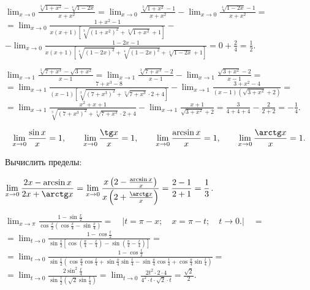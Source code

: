 \documentclass[a5paper,10pt]{article}
\begin{document}
\medskip
{} $\displaystyle\lim_{x\to 0}
\frac{\sqrt[3]{1+x^2}-\sqrt[4]{1-2x}}{x+x^2}=
\lim_{x\to 0}\frac{\sqrt[3]{1+x^2}-1}{x+x^2}-
\lim_{x\to 0}\frac{\sqrt[4]{1-2x}-1}{x+x^2}=$\\
$\displaystyle =\lim_{x\to 0}\frac{1+x^2-1}
{x(x+1)[\sqrt[3]{(1+x^2)^2}+\sqrt[3]{1+x^2}+1]}-$\\
$\displaystyle-\lim_{x\to 0}\frac{1-2x-1}
{x(x+1)[\sqrt[4]{(1-2x)^3}+\sqrt[4]{(1-2x)^2}+\sqrt[4]{1-2x}+1]}=
0+\frac24=\frac12$.

\medskip
{} $\displaystyle\lim_{x\to 1}
\frac{\sqrt[3]{7+x^3}-\sqrt{3+x^2}}{x-1}=
\lim_{x\to 1}\frac{\sqrt[3]{7+x^3}-2}{x-1}-
\lim_{x\to 1}\frac{\sqrt{3+x^2}-2}{x-1}=$\\
$\displaystyle=\lim_{x\to 1}\frac{7+x^3-8}
{(x-1)[\sqrt[3]{(7+x^3)^2}+\sqrt[3]{7+x^3}\cdot2+4]}-
\lim_{x\to 1}\frac{3+x^2-4}{(x-1)(\sqrt{3+x^2}+2)}=$\\
$\displaystyle=\lim_{x\to 1}\frac{x^2+x+1}
{\sqrt[3]{(7+x^3)^2}+\sqrt[3]{7+x^3}\cdot2+4}-
\lim_{x\to 1}\frac{x+1}{\sqrt{3+x^2}+2}=\frac{3}{4+4+4}-\frac{2}{2+2}=-\frac14$.

\medskip
{}
$$\lim_{x\to0}\frac{\sin x}{x}=1,\qquad \lim_{x\to0}\frac{\tg x}{x}=1,\qquad
\lim_{x\to0}\frac{\arcsin x}{x}=1,\qquad \lim_{x\to0}\frac{\arctg x}{x}=1.$$

\medskip
\noindent Вычислить пределы:

\medskip
{} $\displaystyle\lim_{x\to 0}
\frac{2x-\arcsin x}{2x+\arctg x}=\lim_{x\to 0}
\frac{x\left(2-\frac{\arcsin x}{x}\right)}
{x\left(2+\frac{\arctg x}{x}\right)}=
\frac{2-1}{2+1}=\frac13$.

\medskip
{} $\displaystyle\lim_{x\to\pi}
\frac{1-\sin\frac{x}{2}}{\cos\frac{x}{2}(\cos\frac{x}{4}-\sin\frac{x}{4})}=
\quad|t=\pi-x;\quad x=\pi-t;\quad t\to 0.|\quad=$\\
$\displaystyle=\lim_{t\to 0}\frac{1-\cos\frac{t}{2}}{\sin\frac{t}{2}
\left[\cos\left(\frac{\pi}{4}-\frac{t}{4}\right)-
\sin\left(\frac{\pi}{4}-\frac{t}{4}\right)\right]}=$\\
$\displaystyle=\lim_{t\to 0}\frac{1-\cos\frac{t}{2}}{\sin\frac{t}{2}
\left(\cos\frac{\pi}{4}\cos\frac{t}{4}+\sin\frac{\pi}{4}\sin\frac{t}{4}-
\sin\frac{\pi}{4}\cos\frac{t}{4}+\cos\frac{\pi}{4}\sin\frac{t}{4}\right)}=$\\
$\displaystyle=\lim_{t\to 0}\frac{2\sin^2\frac{t}{4}}{\sin\frac{t}{2}
\left(\sqrt2\sin\frac{t}{4}\right)}=
\lim_{t\to 0}\frac{2t^2\cdot 2\cdot 4}
{4^2\cdot t\cdot\sqrt2\cdot t}=\frac{\sqrt2}{2}$.
\end{document}
